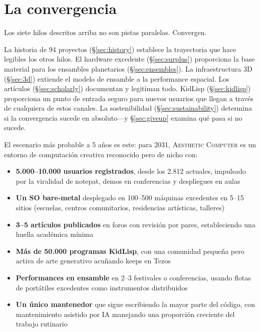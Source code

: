 \documentclass[10pt,letterpaper,twocolumn]{article}
\newcommand{\ac}{\textsc{Aesthetic Computer}}
\begin{document}

\section{La convergencia}
\label{sec:convergence}

Los siete hilos descritos arriba no son pistas paralelas. Convergen.

La historia de 94 proyectos (\S\ref{sec:history}) establece la trayectoria que hace legibles los otros hilos. El hardware excedente (\S\ref{sec:surplus}) proporciona la base material para los ensambles planetarios (\S\ref{sec:ensembles}). La infraestructura 3D (\S\ref{sec:3d}) extiende el modelo de ensamble a la performance espacial. Los artículos (\S\ref{sec:scholarly}) documentan y legitiman todo. KidLisp (\S\ref{sec:kidlisp}) proporciona un punto de entrada seguro para nuevos usuarios que llegan a través de cualquiera de estos canales. La sostenibilidad (\S\ref{sec:sustainability}) determina si la convergencia sucede en absoluto---y \S\ref{sec:giveup} examina qué pasa si no sucede.

El escenario más probable a 5 años es este: para 2031, \ac{} es un entorno de computación creativa reconocido pero de nicho con:

\begin{itemize}
  \item \textbf{5.000--10.000 usuarios registrados}, desde los 2.812 actuales, impulsado por la viralidad de notepat, demos en conferencias y despliegues en aulas
  \item \textbf{Un SO bare-metal} desplegado en 100--500 máquinas excedentes en 5--15 sitios (escuelas, centros comunitarios, residencias artísticas, talleres)
  \item \textbf{3--5 artículos publicados} en foros con revisión por pares, estableciendo una huella académica mínima
  \item \textbf{Más de 50.000 programas KidLisp}, con una comunidad pequeña pero activa de arte generativo acuñando keeps en Tezos
  \item \textbf{Performances en ensamble} en 2--3 festivales o conferencias, usando flotas de portátiles excedentes como instrumentos distribuidos
  \item \textbf{Un único mantenedor} que sigue escribiendo la mayor parte del código, con mantenimiento asistido por IA manejando una proporción creciente del trabajo rutinario
\end{itemize}
\end{document}
